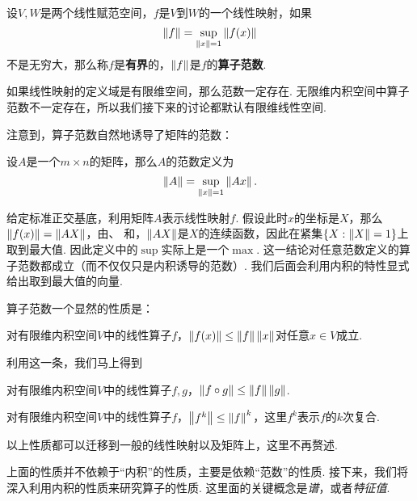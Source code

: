 \begin{definition}[线性映射的范数]
    设$V,W$是两个线性赋范空间，$f$是$V$到$W$的一个线性映射，如果
    \[\left\|f\right\|=\sup_{\left\|x\right\|=1}\left\|f(x)\right\|\]
    不是无穷大，那么称$f$是\textbf{有界}的，$\left\|f\right\|$是$f$的\textbf{算子范数}. 
\end{definition}

如果线性映射的定义域是有限维空间，那么范数一定存在. 无限维内积空间中算子范数不一定存在，所以我们接下来的讨论都默认有限维线性空间. 

注意到，算子范数自然地诱导了矩阵的范数：
\begin{definition}[矩阵范数]
    设$A$是一个$m\times n$的矩阵，那么$A$的范数定义为
    \[\left\|A\right\|=\sup_{\left\|x\right\|=1}\left\|Ax\right\|.\]
\end{definition}

给定标准正交基底，利用矩阵$A$表示线性映射$f$. 假设此时$x$的坐标是$X$，那么$\left\|f(x)\right\|=\left\|AX\right\|$，由、 和，$\left\|AX\right\|$是$X$的连续函数，因此在紧集$\{X:\left\|X\right\|=1\}$上取到最大值. 因此定义中的$\sup$实际上是一个$\max$. 这一结论对任意范数定义的算子范数都成立（而不仅仅只是内积诱导的范数）. 我们后面会利用内积的特性显式给出取到最大值的向量. 

算子范数一个显然的性质是：

\begin{proposition}\label{prop:norm-ineq}
对有限维内积空间$V$中的线性算子$f$，$\left\|f(x)\right\|\leq \left\|f\right\|\left\|x\right\|$对任意$x\in V$成立. 
\end{proposition}

利用这一条，我们马上得到

\begin{proposition}\label{prop:operator-norm-ineq}
对有限维内积空间$V$中的线性算子$f,g$，$\left\|f\circ g\right\|\leq \left\|f\right\|\left\|g\right\|$.
\end{proposition}

\begin{proposition}\label{prop:operator-power-norm-ineq}
    对有限维内积空间$V$中的线性算子$f$，$\left\|f^k\right\|\leq \left\|f\right\|^k$，这里$f^k$表示$f$的$k$次复合. 
\end{proposition}

以上性质都可以迁移到一般的线性映射以及矩阵上，这里不再赘述. 

上面的性质并不依赖于“内积”的性质，主要是依赖“范数”的性质. 接下来，我们将深入利用内积的性质来研究算子的性质. 这里面的关键概念是\emph{谱}，或者\emph{特征值}. 

